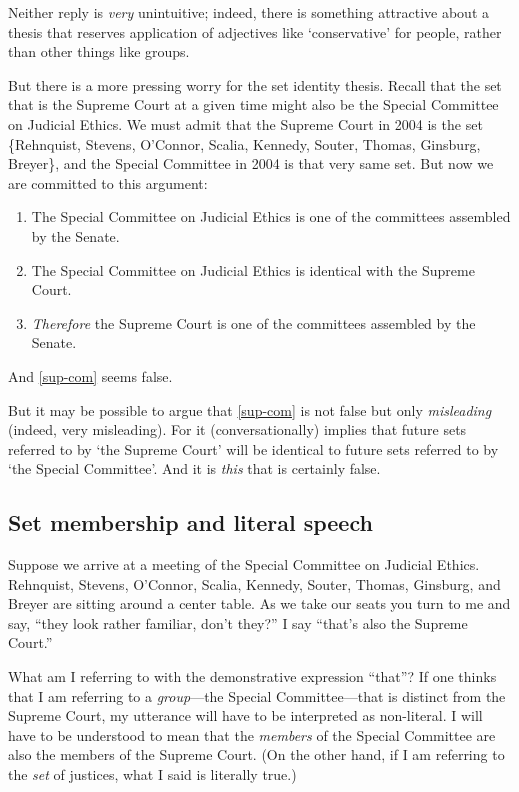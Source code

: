 \documentclass[11pt]{article}
\begin{document}
\begin{spacing}{1.5}
Neither reply is {\em very} unintuitive; indeed, there is something
attractive about a thesis that reserves application of adjectives like
`conservative' for people, rather than other things like groups.

But there is a more pressing worry for the set identity thesis.
Recall that the set that is the Supreme Court at a given time might
also be the Special Committee on Judicial Ethics.  We must admit that
the Supreme Court in 2004 is the set \{Rehnquist, Stevens, O'Connor,
Scalia, Kennedy, Souter, Thomas, Ginsburg, Breyer\}, and the Special
Committee in 2004 is that very same set.  But now we are committed to
this argument:

\begin{enumerate}[ref=(\arabic*)]
  \item The Special Committee on Judicial Ethics is one of the
    committees assembled by the Senate.

  \item The Special Committee on Judicial Ethics is identical with the
    Supreme Court.

  \item {\em Therefore} the Supreme Court is one of the committees
    assembled by the
    Senate. \citep[144]{uzquiano2004a} \label{sup-com}
\end{enumerate}

And \ref{sup-com} seems false.

But it may be possible to argue that \ref{sup-com} is not false but
only {\em misleading} (indeed, very misleading).  For it
(conversationally) implies that future sets referred to by `the
Supreme Court' will be identical to future sets referred to by `the
Special Committee'.  And it is {\em this} that is certainly false.

\subsection{Set membership and literal speech}
\label{implicate}
Suppose we arrive at a meeting of the Special Committee on Judicial
Ethics.  Rehnquist, Stevens, O'Connor, Scalia, Kennedy, Souter,
Thomas, Ginsburg, and Breyer are sitting around a center table.  As we
take our seats you turn to me and say, ``they look rather familiar,
don't they?''  I say ``that's also the Supreme Court.''

What am I referring to with the demonstrative expression ``that''?  If
one thinks that I am referring to a {\em group}---the Special
Committee---that is distinct from the Supreme Court, my utterance will
have to be interpreted as non-literal.  I will have to be understood
to mean that the {\em members} of the Special Committee are also the
members of the Supreme Court.  (On the other hand, if I am referring
to the {\em set} of justices, what I said is literally true.)


\end{spacing}
\end{document}
